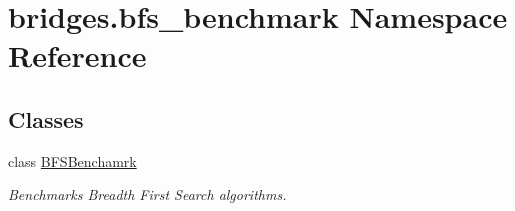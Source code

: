 \hypertarget{namespacebridges_1_1bfs__benchmark}{}\section{bridges.\+bfs\+\_\+benchmark Namespace Reference}
\label{namespacebridges_1_1bfs__benchmark}
\subsection*{Classes}
\begin{DoxyCompactItemize}
\item 
class \mbox{\hyperlink{classbridges_1_1bfs__benchmark_1_1_b_f_s_benchamrk}{B\+F\+S\+Benchamrk}}
\begin{DoxyCompactList}\small\item\em Benchmarks Breadth First Search algorithms. \end{DoxyCompactList}\end{DoxyCompactItemize}
